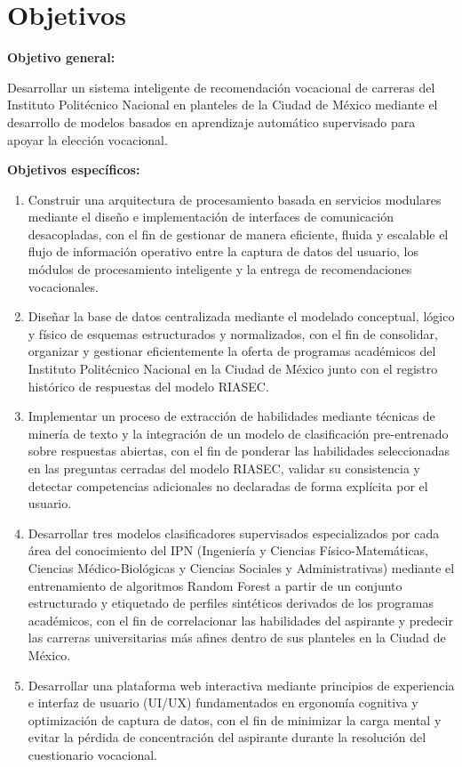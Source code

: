 \section{Objetivos}

\textbf{Objetivo general:}

Desarrollar un sistema inteligente de recomendación vocacional de carreras del Instituto Politécnico Nacional en planteles de la Ciudad de México mediante el desarrollo de modelos basados en aprendizaje automático supervisado para apoyar la elección vocacional.
\medskip

\textbf{Objetivos específicos:}

\begin{enumerate}
    \item Construir una arquitectura de procesamiento basada en servicios modulares mediante el diseño e implementación de interfaces de comunicación desacopladas, con el fin de gestionar de manera eficiente, fluida y escalable el flujo de información operativo entre la captura de datos del usuario, los módulos de procesamiento inteligente y la entrega de recomendaciones vocacionales.
    \item Diseñar la base de datos centralizada mediante el modelado conceptual, lógico y físico de esquemas estructurados y normalizados, con el fin de consolidar, organizar y gestionar eficientemente la oferta de programas académicos del Instituto Politécnico Nacional en la Ciudad de México junto con el registro histórico de respuestas del modelo RIASEC.
    \item Implementar un proceso de extracción de habilidades mediante técnicas de minería de texto y la integración de un modelo de clasificación pre-entrenado sobre respuestas abiertas, con el fin de ponderar las habilidades seleccionadas en las preguntas cerradas del modelo RIASEC, validar su consistencia y detectar competencias adicionales no declaradas de forma explícita por el usuario.
    \item Desarrollar tres modelos clasificadores supervisados especializados por cada área del conocimiento del IPN (Ingeniería y Ciencias Físico-Matemáticas, Ciencias Médico-Biológicas y Ciencias Sociales y Administrativas) mediante el entrenamiento de algoritmos Random Forest a partir de un conjunto estructurado y etiquetado de perfiles sintéticos derivados de los programas académicos, con el fin de correlacionar las habilidades del aspirante y predecir las carreras universitarias más afines dentro de sus planteles en la Ciudad de México.
    \item Desarrollar una plataforma web interactiva mediante principios de experiencia e interfaz de usuario (UI/UX) fundamentados en ergonomía cognitiva y optimización de captura de datos, con el fin de minimizar la carga mental y evitar la pérdida de concentración del aspirante durante la resolución del cuestionario vocacional.

\end{enumerate}
